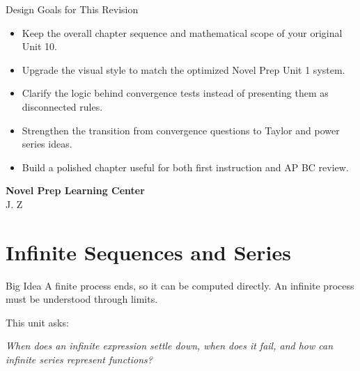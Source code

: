 \documentclass[11pt]{article}
\begin{document}
\begin{titlepage}

\vfill

\begin{minipage}{0.84\textwidth}
\begin{notebox}{Design Goals for This Revision}
\begin{itemize}
    \item Keep the overall chapter sequence and mathematical scope of your original Unit 10.
    \item Upgrade the visual style to match the optimized Novel Prep Unit 1 system.
    \item Clarify the logic behind convergence tests instead of presenting them as disconnected rules.
    \item Strengthen the transition from convergence questions to Taylor and power series ideas.
    \item Build a polished chapter useful for both first instruction and AP BC review.
\end{itemize}
\end{notebox}
\end{minipage}

\vfill

{\large\textbf{Novel Prep Learning Center}}\\[0.25em]
{\large J. Z}

\end{titlepage}

\tableofcontents
\newpage

\setcounter{section}{9}
\section{Infinite Sequences and Series}

\begin{theorybox}{Big Idea}
A finite process ends, so it can be computed directly.  
An infinite process must be understood through limits.

This unit asks:
\begin{center}
\itshape
When does an infinite expression settle down, when does it fail, and how can infinite series represent functions?
\end{center}
\end{theorybox}
\end{document}
